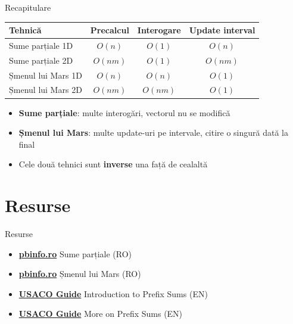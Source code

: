 \documentclass{beamer}
\begin{document}
\begin{frame}{Recapitulare}
  \begin{center}
  \begin{tabular}{lccc}
    \toprule
    Tehnică & Precalcul & Interogare & Update interval \\
    \midrule
    Sume parțiale 1D   & $O(n)$    & $O(1)$    & $O(n)$ \\
    Sume parțiale 2D   & $O(nm)$   & $O(1)$    & $O(nm)$ \\
    Șmenul lui Mars 1D & $O(n)$    & $O(n)$    & $O(1)$ \\
    Șmenul lui Mars 2D & $O(nm)$   & $O(nm)$   & $O(1)$ \\
    \bottomrule
  \end{tabular}
  \end{center}

  \smallskip
  \begin{itemize}
    \item \textbf{Sume parțiale}: multe interogări, vectorul nu se modifică
    \item \textbf{Șmenul lui Mars}: multe update-uri pe intervale, citire o singură dată la final
    \item Cele două tehnici sunt \textbf{inverse} una față de cealaltă
  \end{itemize}
\end{frame}

\section{Resurse}

\begin{frame}{Resurse}
  \begin{itemize}\itemsep6pt
    \item \href{https://www.pbinfo.ro}{\textbf{pbinfo.ro}} \textemdash{} Sume parțiale (RO)
    \item \href{https://www.pbinfo.ro}{\textbf{pbinfo.ro}} \textemdash{} Șmenul lui Mars (RO)
    \item \href{https://usaco.guide/silver/prefix-sums?lang=cpp}{\textbf{USACO Guide}} \textemdash{} Introduction to Prefix Sums (EN)
    \item \href{https://usaco.guide/silver/more-prefix-sums?lang=cpp}{\textbf{USACO Guide}} \textemdash{} More on Prefix Sums (EN)
  \end{itemize}
\end{frame}
\end{document}
